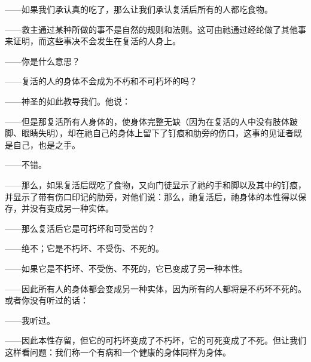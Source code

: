 ——如果我们承认真的吃了，那么让我们承认复活后所有的人都吃食物。\par

——救主通过某种所做的事不是自然的规则和法则。这可由祂通过经纶做了其他事来证明，而这些事决不会发生在复活的人身上。\par

——你是什么意思？\par

——复活的人的身体不会成为不朽和不可朽坏的吗？\par

——神圣的如此教导我们。他说：\par

——但是那复活所有人身体的，使身体完整无缺（因为在复活的人中没有肢体跛脚、眼睛失明），却在祂自己的身体上留下了钉痕和肋旁的伤口，这事的见证者既是自己，也是之手。\par

——不错。\par

——那么，如果复活后既吃了食物，又向门徒显示了祂的手和脚以及其中的钉痕，并显示了带有伤口印记的肋旁，对他们说：那么，祂复活后，祂身体的本性得以保存，并没有变成另一种实体。\par

——那么复活后它是可朽坏和可受苦的？\par

——绝不；它是不朽坏、不受伤、不死的。\par

——如果它是不朽坏、不受伤、不死的，它已变成了另一种本性。\par

——因此所有人的身体都会变成另一种实体，因为所有的人都将是不朽坏不死的。或者你没有听过的话：\par

——我听过。\par

——因此本性存留，但它的可朽坏变成了不朽坏，它的可死变成了不死。但让我们这样看问题：我们称一个有病和一个健康的身体同样为身体。\par

